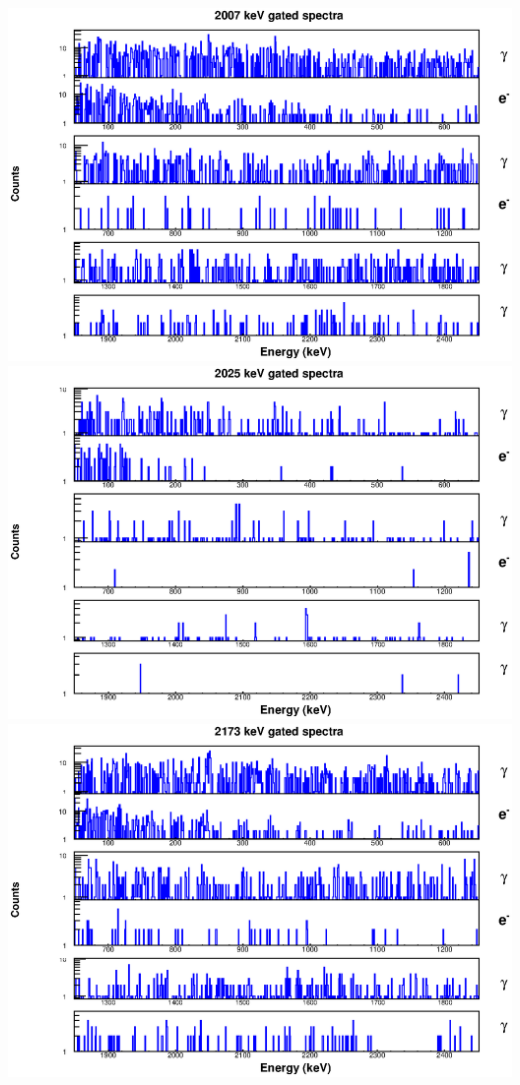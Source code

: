 \includegraphics[scale=0.8]{154Gd_Appendix/2007_combined.eps}
\includegraphics[scale=0.8]{154Gd_Appendix/2025_combined.eps}
\includegraphics[scale=0.8]{154Gd_Appendix/2173_combined.eps}
